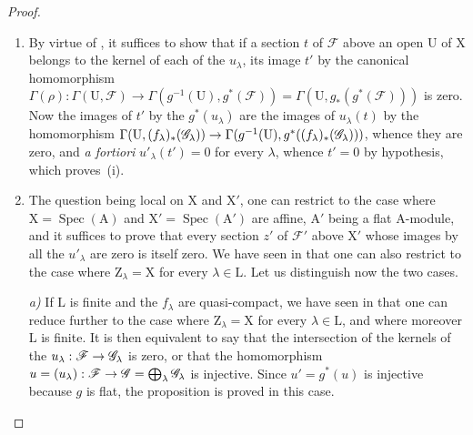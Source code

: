 \begin{proof}
\begin{enumerate}[label=(\roman*)]
  \item By virtue of , it suffices to show that if a section $t$ of $\mathscr{F}$ above an open $\mathrm{U}$ of $\mathrm{X}$ belongs to the kernel of each of the $u_\lambda$, its image $t'$ by the canonical homomorphism $\Gamma(\rho):\Gamma(\mathrm{U},\mathscr{F})\to\Gamma(g^{-1}(\mathrm{U}),g^*(\mathscr{F}))=\Gamma(\mathrm{U},g_*(g^*(\mathscr{F})))$ is zero.
  Now the images of $t'$ by the $g^*(u_\lambda)$ are the images of $u_\lambda(t)$ by the homomorphism $\Gamma(\mathrm{U},(f_\lambda)_*(\mathscr{G}_\lambda))\to\Gamma(g^{-1}(\mathrm{U}),g^*((f_\lambda)_*(\mathscr{G}_\lambda)))$, whence they are zero, and \emph{a fortiori} $u'_\lambda(t')=0$ for every $\lambda$, whence $t'=0$ by hypothesis, which proves~(i).

  \item The question being local on $\mathrm{X}$ and $\mathrm{X}'$, one can restrict to the case where $\mathrm{X}=\operatorname{Spec}(\mathrm{A})$ and $\mathrm{X}'=\operatorname{Spec}(\mathrm{A}')$ are affine, $\mathrm{A}'$ being a flat $\mathrm{A}$-module, and it suffices to prove that every section $z'$ of $\mathscr{F}'$ above $\mathrm{X}'$ whose images by all the $u'_\lambda$ are zero is itself zero.
  We have seen in  that one can also restrict to the case where $\mathrm{Z}_\lambda=\mathrm{X}$ for every $\lambda\in\mathrm{L}$.
  Let us distinguish now the two cases.
  \medskip

  \emph{a)} If $\mathrm{L}$ is finite and the $f_\lambda$ are quasi-compact, we have seen in  that one can reduce further to the case where $\mathrm{Z}_\lambda=\mathrm{X}$ for every $\lambda\in\mathrm{L}$, and where moreover $\mathrm{L}$ is finite.
  It is then equivalent to say that the intersection of the kernels of the $u_\lambda:\mathscr{F}\to\mathscr{G}_\lambda$ is zero, or that the homomorphism $u=(u_\lambda):\mathscr{F}\to\mathscr{G}=\bigoplus_\lambda\mathscr{G}_\lambda$ is injective.
  Since $u'=g^*(u)$ is injective because $g$ is flat, the proposition is proved in this case.


\end{enumerate}
\end{proof}
